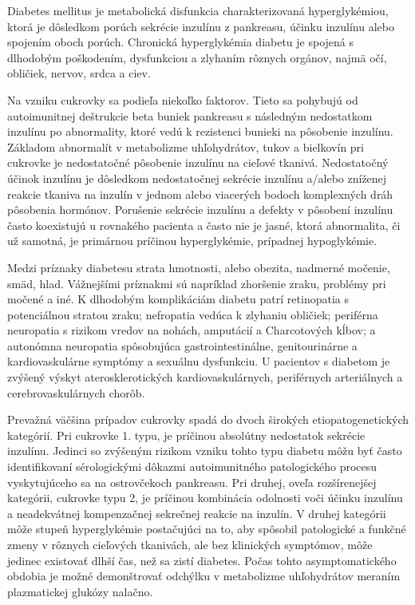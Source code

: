 Diabetes mellitus je metabolická disfunkcia charakterizovaná hyperglykémiou, ktorá je dôsledkom porúch sekrécie inzulínu z pankreasu, účinku inzulínu alebo spojením oboch porúch.
Chronická hyperglykémia diabetu je spojená s dlhodobým poškodením, dysfunkciou a zlyhaním rôznych orgánov, najmä očí, obličiek, nervov, srdca a ciev.

Na vzniku cukrovky sa podieľa niekoľko faktorov. Tieto sa pohybujú od autoimunitnej deštrukcie beta buniek pankreasu s následným nedostatkom inzulínu po abnormality, ktoré vedú k rezistenci bunieki na pôsobenie inzulínu.
Základom abnormalít v metabolizme uhľohydrátov, tukov a bielkovín pri cukrovke je nedostatočné pôsobenie inzulínu na cieľové tkanivá. Nedostatočný účinok inzulínu je dôsledkom nedostatočnej sekrécie inzulínu a/alebo zníženej reakcie tkaniva na inzulín v jednom alebo viacerých bodoch komplexných dráh pôsobenia hormónov. Porušenie sekrécie inzulínu a defekty v pôsobení inzulínu často koexistujú u rovnakého pacienta a často nie je jasné, ktorá abnormalita, či už samotná, je primárnou príčinou hyperglykémie, prípadnej hypoglykémie.

Medzi príznaky diabetesu strata hmotnosti, alebo obezita, nadmerné močenie, smäd, hlad. Vážnejšími príznakmi sú napríklad zhoršenie zraku, problémy pri močené a iné.
K dlhodobým komplikáciám diabetu patrí retinopatia s potenciálnou stratou zraku; nefropatia vedúca k zlyhaniu obličiek; periférna neuropatia s rizikom vredov na nohách, amputácií a Charcotových kĺbov; a autonómna neuropatia spôsobujúca gastrointestinálne, genitourinárne a kardiovaskulárne symptómy a sexuálnu dysfunkciu. U pacientov s diabetom je zvýšený výskyt aterosklerotických kardiovaskulárnych, periférnych arteriálnych a cerebrovaskulárnych chorôb.

Prevažná väčšina prípadov cukrovky spadá do dvoch širokých etiopatogenetických kategórií. Pri cukrovke 1. typu, je príčinou absolútny nedostatok sekrécie inzulínu. Jedinci so zvýšeným rizikom vzniku tohto typu diabetu môžu byť často identifikovaní sérologickými dôkazmi autoimunitného patologického procesu vyskytujúceho sa na ostrovčekoch pankreasu. Pri druhej, oveľa rozšírenejšej kategórii, cukrovke typu 2, je príčinou kombinácia odolnosti voči účinku inzulínu a neadekvátnej kompenzačnej sekrečnej reakcie na inzulín. V druhej kategórii môže stupeň hyperglykémie postačujúci na to, aby spôsobil patologické a funkčné zmeny v rôznych cieľových tkanivách, ale bez klinických symptómov, môže jedinec existovať dlhší čas, než sa zistí diabetes. Počas tohto asymptomatického obdobia je možné demonštrovať odchýlku v metabolizme uhľohydrátov meraním plazmatickej glukózy nalačno.



